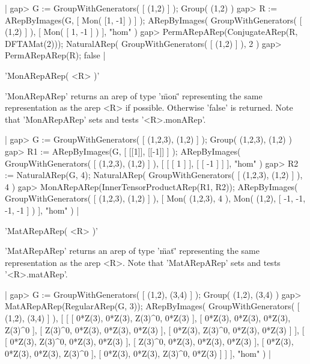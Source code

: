 |    gap> G := GroupWithGenerators( [ (1,2) ] );        
    Group( (1,2) )
    gap> R := ARepByImages(G, [ Mon( [1, -1] ) ] );
    ARepByImages(
      GroupWithGenerators( [ (1,2) ] ),
      [ Mon( [ 1, -1 ] )
      ],
      "hom"
    )
    gap> PermARepARep(ConjugateARep(R, DFTAMat(2)));
    NaturalARep( GroupWithGenerators( [ (1,2) ] ), 2 ) 
    gap> PermARepARep(R);
    false |


'MonARepARep( <R> )'

'MonARepARep' returns an arep of type '\"mon\"' representing 
the same representation as the arep <R> if possible. Otherwise
'false' is returned.
Note that 'MonARepARep' sets and tests '<R>.monARep'.

|    gap> G := GroupWithGenerators( [ (1,2,3), (1,2) ] );
    Group( (1,2,3), (1,2) )
    gap> R1 := ARepByImages(G, [ [[1]], [[-1]] ] );
    ARepByImages(
      GroupWithGenerators( [ (1,2,3), (1,2) ] ),
      [ [ [ 1 ] ],
        [ [ -1 ] ]
      ],
      "hom"
    )
    gap> R2 := NaturalARep(G, 4);
    NaturalARep( GroupWithGenerators( [ (1,2,3), (1,2) ] ), 4 )
    gap> MonARepARep(InnerTensorProductARep(R1, R2));
    ARepByImages(
      GroupWithGenerators( [ (1,2,3), (1,2) ] ),
      [ Mon( (1,2,3), 4 ),
        Mon(
          (1,2),
          [ -1, -1, -1, -1 ]
        )
      ],
      "hom"
    ) |


'MatARepARep( <R> )'

'MatARepARep' returns an arep of type '\"mat\"' representing 
the same representation as the arep <R>.
Note that 'MatARepARep' sets and tests '<R>.matARep'.

|    gap> G := GroupWithGenerators( [ (1,2), (3,4) ] );
    Group( (1,2), (3,4) )
    gap> MatARepARep(RegularARep(G, 3));
    ARepByImages(
      GroupWithGenerators( [ (1,2), (3,4) ] ),
      [ [ [ 0*Z(3), 0*Z(3), Z(3)^0, 0*Z(3) ], 
          [ 0*Z(3), 0*Z(3), 0*Z(3), Z(3)^0 ], 
          [ Z(3)^0, 0*Z(3), 0*Z(3), 0*Z(3) ], 
          [ 0*Z(3), Z(3)^0, 0*Z(3), 0*Z(3) ] ],
        [ [ 0*Z(3), Z(3)^0, 0*Z(3), 0*Z(3) ], 
          [ Z(3)^0, 0*Z(3), 0*Z(3), 0*Z(3) ], 
          [ 0*Z(3), 0*Z(3), 0*Z(3), Z(3)^0 ], 
          [ 0*Z(3), 0*Z(3), Z(3)^0, 0*Z(3) ] ]
      ],
      "hom"
    ) |


